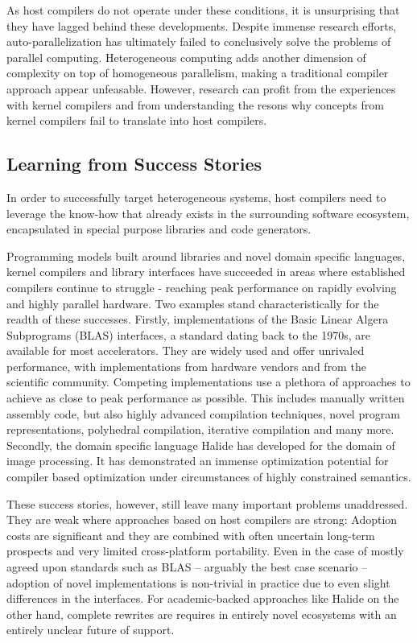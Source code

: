     As host compilers do not operate under these conditions, it is unsurprising
    that they have lagged behind these developments.
    Despite immense research efforts, auto-parallelization has ultimately failed
    to conclusively solve the problems of parallel computing.
    Heterogeneous computing adds another dimension of complexity on top of
    homogeneous parallelism, making a traditional compiler approach appear
    unfeasable.
    However, research can profit from the experiences with kernel compilers
    and from understanding the resons why concepts from kernel compilers fail to
    translate into host compilers.

    \subsection*{Learning from Success Stories}

    In order to successfully target heterogeneous systems, host compilers need
    to leverage the know-how that already exists in the surrounding software
    ecosystem, encapsulated in special purpose libraries and code generators.

    Programming models built around libraries and novel domain specific
    languages, kernel compilers and library interfaces have succeeded in areas
    where established compilers continue to struggle - reaching peak performance
    on rapidly evolving and highly parallel hardware.
    Two examples stand characteristically for the readth of these successes.
    Firstly, implementations of the Basic Linear Algera Subprograms (BLAS)
    interfaces, a standard dating back to the 1970s, are available for most
    accelerators.
    They are widely used and offer unrivaled performance, with implementations
    from hardware vendors and from the scientific community.
    Competing implementations use a plethora of approaches to achieve as close
    to peak performance as possible.
    This includes manually written assembly code, but also highly advanced
    compilation techniques, novel program representations, polyhedral
    compilation, iterative compilation and many more.
    Secondly, the domain specific language Halide has developed for the domain
    of image processing.
    It has demonstrated an immense optimization potential for compiler based
    optimization under circumstances of highly constrained semantics.

    These success stories, however, still leave many important problems
    unaddressed.
    They are weak where approaches based on host compilers are strong:
    Adoption costs are significant and they are combined with often uncertain
    long-term prospects and very limited cross-platform portability.
    Even in the case of mostly agreed upon standards such as BLAS --
    arguably the best case scenario -- adoption of novel implementations is
    non-trivial in practice due to even slight differences in the interfaces.
    For academic-backed approaches like Halide on the other hand, complete
    rewrites are requires in entirely novel ecosystems with an entirely unclear
    future of support.

